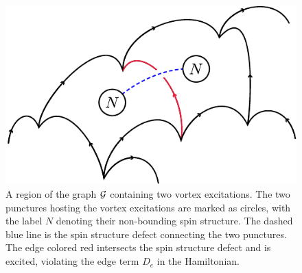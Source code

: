 \begin{figure}
\begin{center}
\includegraphics{graph_with_edge_excitationprime.pdf}
\caption{\label{lattice_w_vortices} A region of the graph $\mathcal{G}$ containing two vortex excitations. 
The two punctures hosting the vortex excitations are marked as circles, with the label $N$ denoting their non-bounding spin structure. 
The dashed blue line is the spin structure defect connecting the two punctures.
The edge colored red intersects the spin structure defect and is excited, violating the edge term $D_e$ in the Hamiltonian. 
}
\end{center}
\end{figure}

